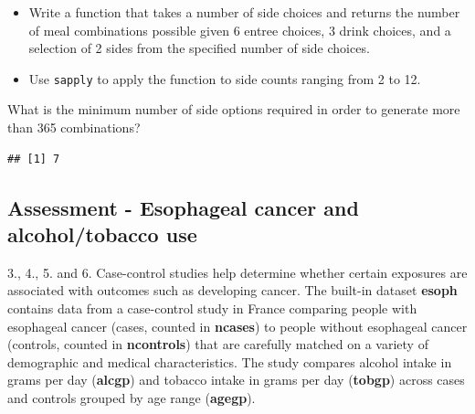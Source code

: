 \documentclass[
]{article}
\newenvironment{Shaded}{\begin{snugshade}}{\end{snugshade}}
\newcommand{\ControlFlowTok}[1]{\textcolor[rgb]{0.13,0.29,0.53}{\textbf{#1}}}
\newcommand{\DataTypeTok}[1]{\textcolor[rgb]{0.13,0.29,0.53}{#1}}
\newcommand{\DecValTok}[1]{\textcolor[rgb]{0.00,0.00,0.81}{#1}}
\newcommand{\KeywordTok}[1]{\textcolor[rgb]{0.13,0.29,0.53}{\textbf{#1}}}
\newcommand{\NormalTok}[1]{#1}
\newcommand{\OperatorTok}[1]{\textcolor[rgb]{0.81,0.36,0.00}{\textbf{#1}}}
\newcommand{\StringTok}[1]{\textcolor[rgb]{0.31,0.60,0.02}{#1}}
\providecommand{\tightlist}{%
  \setlength{\itemsep}{0pt}\setlength{\parskip}{0pt}}
\begin{document}
\begin{itemize}
\tightlist
\item
  Write a function that takes a number of side choices and returns the
  number of meal combinations possible given 6 entree choices, 3 drink
  choices, and a selection of 2 sides from the specified number of side
  choices.
\item
  Use \texttt{sapply} to apply the function to side counts ranging from
  2 to 12.
\end{itemize}

What is the minimum number of side options required in order to generate
more than 365 combinations?

\begin{Shaded}
\end{Shaded}

\begin{verbatim}
## [1] 7
\end{verbatim}

\hypertarget{assessment---esophageal-cancer-and-alcoholtobacco-use}{%
\subsection{Assessment - Esophageal cancer and alcohol/tobacco
use}\label{assessment---esophageal-cancer-and-alcoholtobacco-use}}

3., 4., 5. and 6. Case-control studies help determine whether certain
exposures are associated with outcomes such as developing cancer. The
built-in dataset \textbf{esoph} contains data from a case-control study
in France comparing people with esophageal cancer (cases, counted in
\textbf{ncases}) to people without esophageal cancer (controls, counted
in \textbf{ncontrols}) that are carefully matched on a variety of
demographic and medical characteristics. The study compares alcohol
intake in grams per day (\textbf{alcgp}) and tobacco intake in grams per
day (\textbf{tobgp}) across cases and controls grouped by age range
(\textbf{agegp}).
\end{document}
